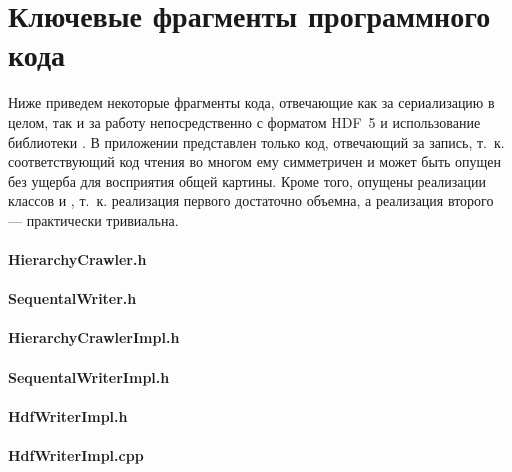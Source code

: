 
\chapter{Ключевые фрагменты программного кода}

Ниже приведем некоторые фрагменты кода, отвечающие как за сериализацию в целом,
так и за работу непосредственно с форматом HDF~5 и использование
библиотеки . В приложении представлен только код, отвечающий
за запись, т.~к. соответствующий код чтения во многом ему симметричен и может
быть опущен без ущерба для восприятия общей картины. Кроме того, опущены
реализации классов  и , т.~к.
реализация первого достаточно объемна, а реализация второго --- практически
тривиальна.

\singlespacing

\subsubsection{HierarchyCrawler.h}


\subsubsection{SequentalWriter.h}


\subsubsection{HierarchyCrawlerImpl.h}


\subsubsection{SequentalWriterImpl.h}


\subsubsection{HdfWriterImpl.h}


\subsubsection{HdfWriterImpl.cpp}

